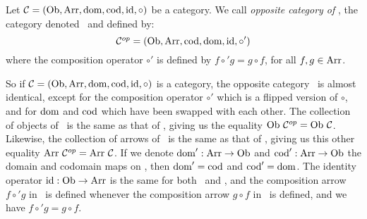 \begin{defin}\label{Cat:def:opposite}
    Let $\mbox{$\cal C$}=(\mbox{\rm Ob}, \mbox{\rm Arr}, \mbox{\rm dom},\mbox{\rm cod}, \mbox{\rm id}, \circ)$ be a category.
    We call {\em opposite category of \Cat}, the category denoted
    \Cop\ and defined by:
        \[
            \mbox{${\cal C}^{op}$}=(\mbox{\rm Ob}, \mbox{\rm Arr}, \mbox{\rm cod}, \mbox{\rm dom}, \mbox{\rm id}, \circ')
        \]
    where the composition operator $\circ'$ is defined by 
    $f \circ' g = g\circ f$, for all $f,g\in\mbox{\rm Arr}$.
\end{defin}

So if $\mbox{$\cal C$}=(\mbox{\rm Ob}, \mbox{\rm Arr}, \mbox{\rm dom},\mbox{\rm cod}, \mbox{\rm id}, \circ)$ is a category, the opposite
category \Cop\ is almost identical, except for the composition operator
$\circ'$ which is a flipped version of $\circ$, and for $\mbox{\rm dom}$ and $\mbox{\rm cod}$ 
which have been swapped with each other. The collection of objects of
\Cop\ is the same as that of \Cat, giving us the equality $\ob\ \Cop=\ob\ 
\Cat$. Likewise, the collection of arrows of \Cop\ is the same as that of 
\Cat, giving us this other equality $\arr\ \Cop=\arr\ \Cat$. If we denote
$\mbox{\rm dom}':\mbox{\rm Arr}\to\mbox{\rm Ob}$ and $\mbox{\rm cod}':\mbox{\rm Arr}\to\mbox{\rm Ob}$ the domain and codomain maps
on \Cop, then $\mbox{\rm dom}'=\mbox{\rm cod}$ and $\mbox{\rm cod}'=\mbox{\rm dom}$. The identity operator 
$\mbox{\rm id}:\mbox{\rm Ob}\to\mbox{\rm Arr}$ is the same for both \Cat\ and \Cop, and the composition
arrow $f\circ' g$ in \Cop\ is defined whenever the composition arrow
$g\circ f$ in \Cat\ is defined, and we have $f\circ' g= g \circ f$.

